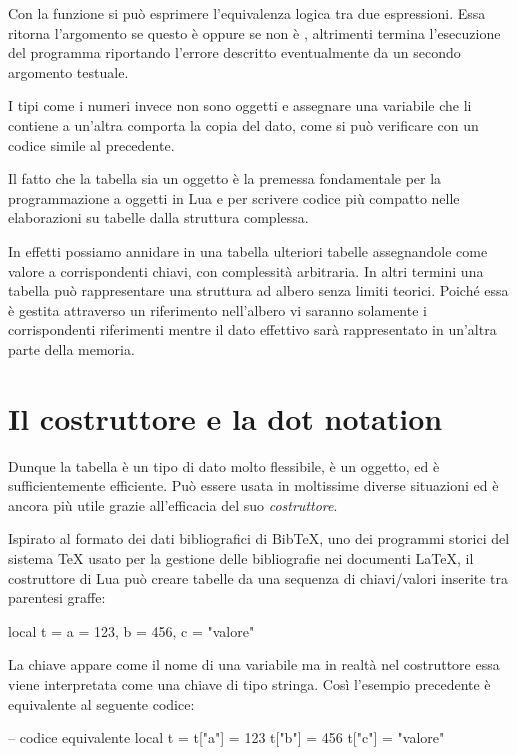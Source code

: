 Con la funzione  si può esprimere l'equivalenza logica tra due
espressioni. Essa ritorna l'argomento se questo è  oppure se non è
, altrimenti termina l'esecuzione del programma riportando l'errore
descritto eventualmente da un secondo argomento testuale.

I tipi come i numeri invece non sono oggetti e assegnare una variabile che li
contiene a un'altra comporta la copia del dato, come si può verificare con un
codice simile al precedente.

Il fatto che la tabella sia un oggetto è la premessa fondamentale per la
programmazione a oggetti in Lua e per scrivere codice più compatto nelle
elaborazioni su tabelle dalla struttura complessa.

In effetti possiamo annidare in una tabella ulteriori tabelle assegnandole come
valore a corrispondenti chiavi, con complessità arbitraria. In altri termini una
tabella può rappresentare una struttura ad albero senza limiti teorici. Poiché
essa è gestita attraverso un riferimento nell'albero vi saranno solamente i
corrispondenti riferimenti mentre il dato effettivo sarà rappresentato in
un'altra parte della memoria.


\section{Il costruttore e la dot notation}

Dunque la tabella è un tipo di dato molto flessibile, è un oggetto, ed è
sufficientemente efficiente. Può essere usata in moltissime diverse situazioni
ed è ancora più utile grazie all'efficacia del suo \emph{costruttore}.

Ispirato al formato dei dati bibliografici di BibTeX, uno dei programmi storici
del sistema \TeX{} usato per la gestione delle bibliografie nei documenti
\LaTeX, il costruttore di Lua può creare tabelle da una sequenza di
chiavi/valori inserite tra parentesi graffe:
\begin{lines}
local t = { a = 123, b = 456, c = "valore" }
\end{lines}

La chiave appare come il nome di una variabile ma in realtà nel costruttore
essa viene interpretata come una chiave di tipo stringa. Così l'esempio
precedente è equivalente al seguente codice:
\begin{lines}
-- codice equivalente
local t = {}
t["a"] = 123
t["b"] = 456
t["c"] = "valore"
\end{lines}

